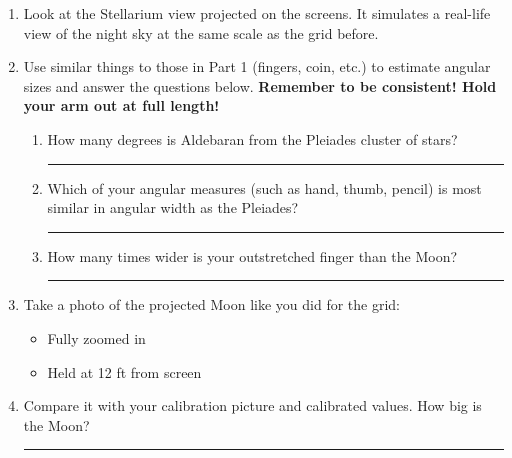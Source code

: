 \documentclass[main.tex]{subfiles}
\begin{document}
\begin{enumerate}
\item Look at the Stellarium view projected on the screens. It simulates a real-life view of the night sky at the same scale as the grid before. 
\item Use similar things to those in Part 1 (fingers, coin, etc.) to estimate angular sizes and answer the questions below. \textbf{Remember to be consistent! Hold your arm out at full length!}
\begin{enumerate}
\item How many degrees is Aldebaran from the Pleiades cluster of stars?\\

\rule{14cm}{.2mm}
\item Which of your angular measures (such as hand, thumb, pencil) is most similar in angular width as the Pleiades?\\

\rule{14cm}{.2mm}
\item How many times wider is your outstretched finger than the Moon?\\

\rule{14cm}{.2mm}
\end{enumerate}
\item Take a photo of the projected Moon like you did for the grid:
	\begin{itemize}
	\item Fully zoomed in
	\item Held at 12 ft from screen
	\end{itemize}
\item Compare it with your calibration picture and calibrated values. How big is the Moon?\\

\rule{15cm}{.2mm}
\end{enumerate}
\end{document}
